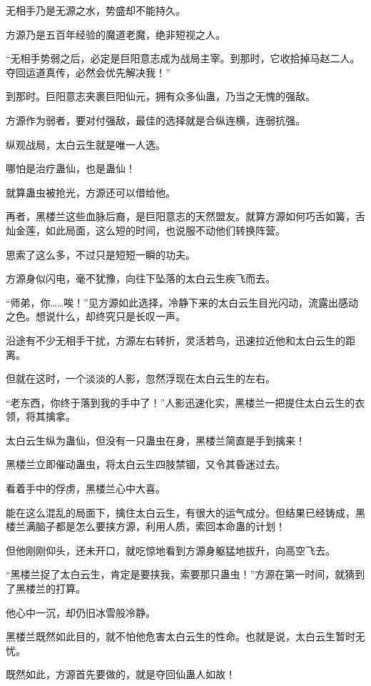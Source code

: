 \begin{this_body}
无相手乃是无源之水，势盛却不能持久。

方源乃是五百年经验的魔道老魔，绝非短视之人。

“无相手势弱之后，必定是巨阳意志成为战局主宰。到那时，它收拾掉马赵二人。夺回运道真传，必然会优先解决我！”

到那时。巨阳意志夹裹巨阳仙元，拥有众多仙蛊，乃当之无愧的强敌。

方源作为弱者，要对付强敌，最佳的选择就是合纵连横，连弱抗强。

纵观战局，太白云生就是唯一人选。

哪怕是治疗蛊仙，也是蛊仙！

就算蛊虫被抢光，方源还可以借给他。

再者，黑楼兰这些血脉后裔，是巨阳意志的天然盟友。就算方源如何巧舌如簧，舌灿金莲，如此局面，这么短的时间，也说服不动他们转换阵营。

思索了这么多，不过只是短短一瞬的功夫。

方源身似闪电，毫不犹豫，向往下坠落的太白云生疾飞而去。

“师弟，你……唉！”见方源如此选择，冷静下来的太白云生目光闪动，流露出感动之色。想说什么，却终究只是长叹一声。

沿途有不少无相手干扰，方源左右转折，灵活若鸟，迅速拉近他和太白云生的距离。

但就在这时，一个淡淡的人影，忽然浮现在太白云生的左右。

“老东西，你终于落到我的手中了！”人影迅速化实，黑楼兰一把提住太白云生的衣领，将其擒拿。

太白云生纵为蛊仙，但没有一只蛊虫在身，黑楼兰简直是手到擒来！

黑楼兰立即催动蛊虫，将太白云生四肢禁锢，又令其昏迷过去。

看着手中的俘虏，黑楼兰心中大喜。

能在这么混乱的局面下，擒住太白云生，有很大的运气成分。但结果已经铸成，黑楼兰满脑子都是怎么要挟方源，利用人质，索回本命蛊的计划！

但他刚刚仰头，还未开口，就吃惊地看到方源身躯猛地拔升，向高空飞去。

“黑楼兰捉了太白云生，肯定是要挟我，索要那只蛊虫！”方源在第一时间，就猜到了黑楼兰的打算。

他心中一沉，却仍旧冰雪般冷静。

黑楼兰既然如此目的，就不怕他危害太白云生的性命。也就是说，太白云生暂时无忧。

既然如此，方源首先要做的，就是夺回仙蛊人如故！


\end{this_body}
